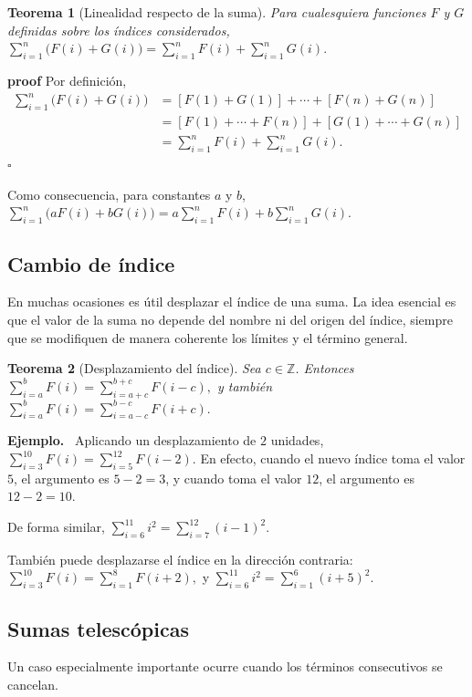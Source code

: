 \documentclass[12pt]{article}
\newenvironment{Ejem}
{\par\medskip\noindent\textbf{Ejemplo.}\ }
{\par\medskip}
\newtheorem{Teo}{Teorema}
\begin{document}
\begin{Teo}[Linealidad respecto de la suma]
Para cualesquiera funciones $F$ y $G$ definidas sobre los índices considerados,
$
\sum_{i=1}^{n}\bigl(F(i)+G(i)\bigr)
=
\sum_{i=1}^{n}F(i)
+
\sum_{i=1}^{n}G(i).
$
\end{Teo}

\textbf{proof}
Por definición,
\begin{align*}
\sum_{i=1}^{n}\bigl(F(i)+G(i)\bigr)
&=
[F(1)+G(1)]+\cdots+[F(n)+G(n)]\\
&=
[F(1)+\cdots+F(n)]
+
[G(1)+\cdots+G(n)]\\
&=
\sum_{i=1}^{n}F(i)+\sum_{i=1}^{n}G(i).
\end{align*}
\hfill$\square$

Como consecuencia, para constantes $a$ y $b$,
$
\sum_{i=1}^{n}\bigl(aF(i)+bG(i)\bigr)
=
a\sum_{i=1}^{n}F(i)
+
b\sum_{i=1}^{n}G(i).
$
\subsection*{Cambio de índice}
En muchas ocasiones es útil desplazar el índice de una suma. La idea esencial
es que el valor de la suma no depende del nombre ni del origen del índice,
siempre que se modifiquen de manera coherente los límites y el término general.

\begin{Teo}[Desplazamiento del índice]
Sea $c\in\mathbb{Z}$. Entonces
$
\sum_{i=a}^{b}F(i)
=
\sum_{i=a+c}^{b+c}F(i-c),
$
y también
$
\sum_{i=a}^{b}F(i)
=
\sum_{i=a-c}^{b-c}F(i+c).
$
\end{Teo}

\begin{Ejem}
Aplicando un desplazamiento de $2$ unidades,
$
\sum_{i=3}^{10}F(i)
=
\sum_{i=5}^{12}F(i-2).
$
En efecto, cuando el nuevo índice toma el valor $5$, el argumento es
$5-2=3$, y cuando toma el valor $12$, el argumento es $12-2=10$.
\end{Ejem}

De forma similar,
$
\sum_{i=6}^{11}i^2
=
\sum_{i=7}^{12}(i-1)^2.
$

También puede desplazarse el índice en la dirección contraria:
$
\sum_{i=3}^{10}F(i)
=
\sum_{i=1}^{8}F(i+2),
$
y
$
\sum_{i=6}^{11}i^2
=
\sum_{i=1}^{6}(i+5)^2.
$
\subsection*{Sumas telescópicas}
Un caso especialmente importante ocurre cuando los términos consecutivos se
cancelan.
\end{document}
